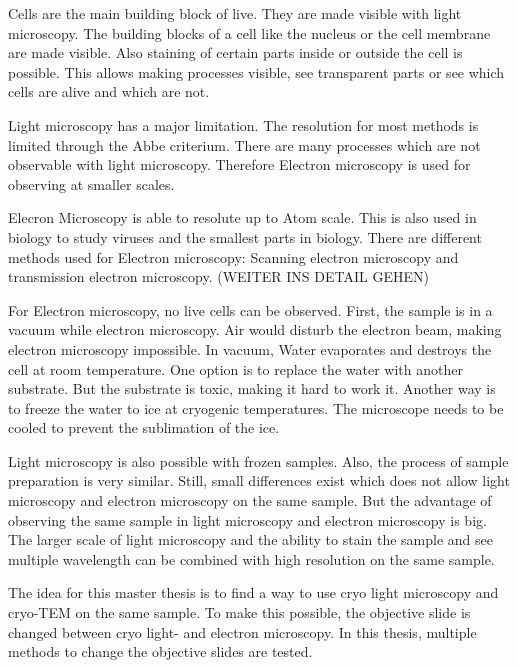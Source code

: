 

Cells are the main building block of live. They are made visible with light microscopy. The building blocks of a cell like the nucleus or the cell membrane are made visible. Also staining of certain parts inside or outside the cell is possible. This allows making processes visible, see transparent parts or see which cells are alive and which are not.

Light microscopy has a major limitation. The resolution for most methods is limited through the Abbe criterium. There are many processes which are not observable with light microscopy. Therefore Electron microscopy is used for observing at smaller scales.

Elecron Microscopy is able to resolute up to Atom scale. This is also used in biology to study viruses and the smallest parts in biology. There are different methods used for Electron microscopy: Scanning electron microscopy and transmission electron microscopy. (WEITER INS DETAIL GEHEN)

For Electron microscopy, no live cells can be observed. First, the sample is in a vacuum while electron microscopy. Air would disturb the electron beam, making electron microscopy impossible. In vacuum, Water evaporates and destroys the cell at room temperature. One option is to replace the water with another substrate. But the substrate is toxic, making it hard to work it. Another way is to freeze the water to ice at cryogenic temperatures. The microscope needs to be cooled to prevent the sublimation of the ice. 

Light microscopy is also possible with frozen samples. Also, the process of sample preparation is very similar. Still, small differences exist which does not allow light  microscopy and electron microscopy on the same sample. But the advantage of observing the same sample in light microscopy and electron microscopy is big. The larger scale of light microscopy and the ability to stain the sample and see multiple wavelength can be combined with high resolution on the same sample.

The idea for this master thesis is to find a way to use cryo light microscopy and cryo-TEM on the same sample. To make this possible, the objective slide is changed between cryo light- and electron microscopy. In this thesis, multiple methods to change the objective slides are tested.


